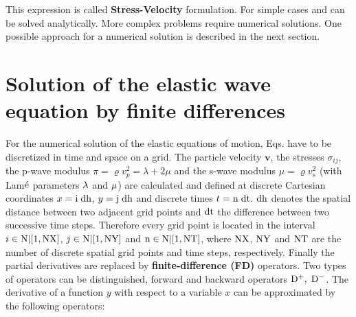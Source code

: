 \documentclass[11pt,onecolumn,oneside]{article}
\begin{document}
This expression is called {\bf{Stress-Velocity}} formulation. For simple cases  and  can be solved analytically. More complex problems require numerical solutions. One possible approach for a numerical solution is described in the next section.

\section{Solution of the elastic wave equation by finite differences}\label{elastic_FD_Code}

For the numerical solution of the elastic equations of motion, Eqs.  have to be discretized in time and space on a grid. The
particle velocity $\mathbf{v}$, the stresses $\sigma_{ij}$, the p-wave modulus $\pi=\varrho v_p^2=\lambda+2\mu$ and the s-wave modulus $\mu=\varrho v_s^2 $ (with Lam$\acute{\rm e}$ parameters $\rm{\lambda}$ and $\rm{\mu}$) are calculated and 
defined at discrete Cartesian coordinates $x=\rm{i}\; \rm{dh}$, $y=\rm{j}\; \rm{dh}$ and discrete times $t=\rm{n}\; \rm{dt}$. 
$\rm{dh}$ denotes the spatial distance between two adjacent grid points and $\rm{dt}$ the difference between two successive time steps. Therefore every grid point is located in the interval  $i \in \rm{N | [1,NX]}$, $j \in \rm{N | [1,NY]}$ and $\rm{n} \in \rm{N | [1,NT]}$, where
$\rm{NX}$, $\rm{NY}$ and $\rm{NT}$ are the number of discrete spatial grid points and time steps, respectively. Finally the partial derivatives are replaced by {\bf{finite-difference} (FD)} operators. 
Two types of operators can be distinguished, forward and backward operators $\rm{D^+,\;D^-}$. The derivative of a function $y$ with respect to a variable $x$ can be approximated by the following operators:  
\\
\end{document}

